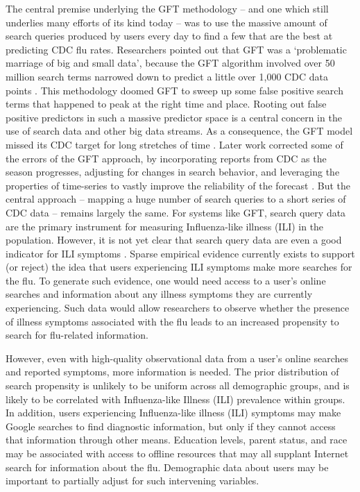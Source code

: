 \documentclass[fleqn,10pt]{wlscirep}
\begin{document}
The central premise underlying the GFT methodology -- and one which still underlies many efforts of its kind today -- was to use the massive amount of search queries produced by users every day to find a few that are the best at predicting CDC flu rates. Researchers pointed out that GFT was a `problematic marriage of big and small data', because the GFT algorithm involved over 50 million search terms narrowed down to predict a little over 1,000 CDC data points \cite{lazer_etal_2014}. This methodology doomed GFT to sweep up some false positive search terms that happened to peak at the right time and place. Rooting out false positive predictors in such a massive predictor space is a central concern in the use of search data and other big data streams. As a consequence, the GFT model missed its CDC target for long stretches of time \cite{lazer_etal_2014}. Later work corrected some of the errors of the GFT approach, by incorporating reports from CDC as the season progresses, adjusting for changes in search behavior, and leveraging the properties of time-series to vastly improve the reliability of the forecast \cite{yang_etal_2015}. But the central approach -- mapping a huge number of search queries to a short series of CDC data -- remains largely the same. 
For systems like GFT, search query data are the primary instrument for measuring Influenza-like illness (ILI) in the population. However, it is not yet clear that search query data are even a good indicator for ILI symptoms \cite{lazer_etal_2014}. Sparse empirical evidence currently exists to support (or reject) the idea that users experiencing ILI symptoms make more searches for the flu. To generate such evidence, one would need access to a user's online searches and information about any illness symptoms they are currently experiencing. Such data would allow researchers to observe whether the presence of illness symptoms associated with the flu leads to an increased propensity to search for flu-related information.

However, even with high-quality observational data from a user's online searches and reported symptoms, more information is needed. The prior distribution of search propensity is unlikely to be uniform across all demographic groups, and is likely to be
correlated with Influenza-like Illness (ILI) prevalence within
groups. In addition, users experiencing Influenza-like illness (ILI) symptoms may make Google searches to find diagnostic information, but only if they cannot access that information through other means. Education levels, parent status, and race may be associated with access to offline resources that may all supplant Internet search for information about the flu. Demographic data about users may be important to partially adjust for such intervening variables.
\end{document}

